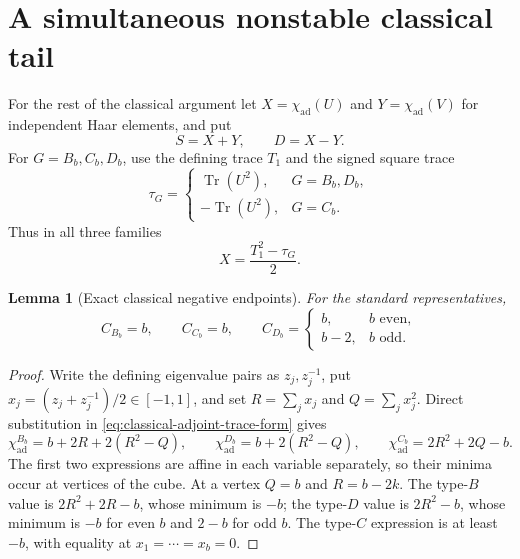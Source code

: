 \documentclass[11pt,reqno]{amsart}
\theoremstyle{plain}
\newtheorem{lemma}[theorem]{Lemma}
\theoremstyle{definition}
\newcommand{\chiad}{\chi_{\mathrm{ad}}}
\begin{document}
\section{A simultaneous nonstable classical tail}

For the rest of the classical argument let $X=\chiad(U)$ and
$Y=\chiad(V)$ for independent Haar elements, and put
\[
 S=X+Y,\qquad D=X-Y.
\]
For $G=B_b,C_b,D_b$, use the defining trace $T_1$ and the signed square
trace
\[
 \tau_G=
 \begin{cases}
  \operatorname{Tr}(U^2),&G=B_b,D_b,\\
  -\operatorname{Tr}(U^2),&G=C_b.
 \end{cases}
\]
Thus in all three families
\begin{equation}
\label{eq:classical-adjoint-trace-form}
 X=\frac{T_1^2-\tau_G}{2}.
\end{equation}

\begin{lemma}[Exact classical negative endpoints]
\label{lem:full-classical-negative-endpoints}
For the standard representatives,
\[
 C_{B_b}=b,\qquad C_{C_b}=b,\qquad
 C_{D_b}=\begin{cases}b,&b\text{ even},\\ b-2,&b\text{ odd}.
 \end{cases}
\]
\end{lemma}

\begin{proof}
Write the defining eigenvalue pairs as $z_j,z_j^{-1}$, put
$x_j=(z_j+z_j^{-1})/2\in[-1,1]$, and set
$R=\sum_jx_j$ and $Q=\sum_jx_j^2$.  Direct substitution in
\eqref{eq:classical-adjoint-trace-form} gives
\[
 \chiad^{B_b}=b+2R+2(R^2-Q),\qquad
 \chiad^{D_b}=b+2(R^2-Q),\qquad
 \chiad^{C_b}=2R^2+2Q-b.
\]
The first two expressions are affine in each variable separately, so their
minima occur at vertices of the cube.  At a vertex $Q=b$ and
$R=b-2k$.  The type-$B$ value is $2R^2+2R-b$, whose minimum is $-b$;
the type-$D$ value is $2R^2-b$, whose minimum is $-b$ for even $b$ and
$2-b$ for odd $b$.  The type-$C$ expression is at least $-b$, with
equality at $x_1=\cdots=x_b=0$.
\end{proof}
\end{document}
